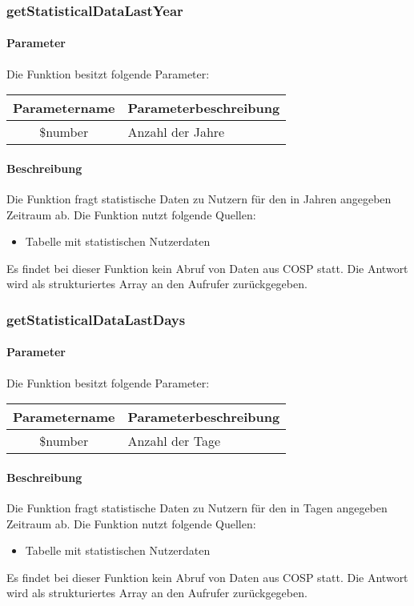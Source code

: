 \subsubsection{getStatisticalDataLastYear}
\paragraph{Parameter} Die Funktion besitzt folgende Parameter:
\begin{table}[H]
	\begin{tabular}{|c|p{11cm}|}
		\hline
		\textbf{Parametername} & \textbf{Parameterbeschreibung} \\ \hline
		\$number & Anzahl der Jahre \\ \hline
	\end{tabular}
\end{table}
\paragraph{Beschreibung} Die Funktion fragt statistische Daten zu Nutzern für den in Jahren angegeben Zeitraum ab. Die Funktion nutzt folgende Quellen:
\begin{itemize}
	\item Tabelle mit statistischen Nutzerdaten
\end{itemize}
Es findet bei dieser Funktion kein Abruf von Daten aus {\glqq COSP\grqq} statt. Die Antwort wird als strukturiertes Array an den Aufrufer zurückgegeben.
\subsubsection{getStatisticalDataLastDays}
\paragraph{Parameter} Die Funktion besitzt folgende Parameter:
\begin{table}[H]
	\begin{tabular}{|c|p{11cm}|}
		\hline
		\textbf{Parametername} & \textbf{Parameterbeschreibung} \\ \hline
		\$number & Anzahl der Tage \\ \hline
	\end{tabular}
\end{table}
\paragraph{Beschreibung} Die Funktion fragt statistische Daten zu Nutzern für den in Tagen angegeben Zeitraum ab. Die Funktion nutzt folgende Quellen:
\begin{itemize}
	\item Tabelle mit statistischen Nutzerdaten
\end{itemize}
Es findet bei dieser Funktion kein Abruf von Daten aus {\glqq COSP\grqq} statt. Die Antwort wird als strukturiertes Array an den Aufrufer zurückgegeben.
